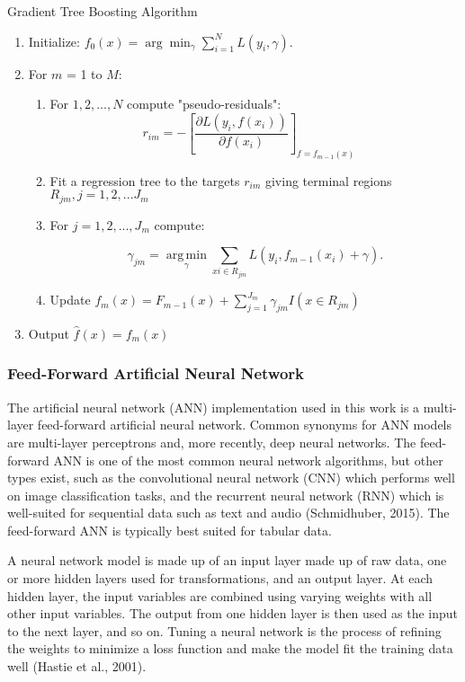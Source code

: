 \documentclass[12pt,]{article}
\begin{document}
\begin{algorithm}
  \caption{Gradient Tree Boosting Algorithm}\label{alg:GBMAlo}
\begin{enumerate}
\item Initialize: $f_0(x) = \arg\min_\gamma \sum_{i=1}^N L(y_i, \gamma).$
\item For $m$ = 1 to $M$:
  \begin{enumerate}
  \item For $1,2,...,N$ compute "pseudo-residuals":
  $$
   r_{im} = -\left[\frac{\partial L(y_i, f(x_i))}{\partial f(x_i)}\right]_{f=f_{m-1}(x)} \quad
  $$
  \item Fit a regression tree to the targets $r_{im}$ giving terminal regions $R_{jm}, j = 1,2,...J_m$
  \item For $j = 1,2,...,J_m$ compute:
  
  $$
  \gamma_{jm} = \underset{\gamma}{\operatorname{arg\,min}} \sum_{xi \in R_{jm}} L\left(y_i, f_{m-1}(x_i) + \gamma \right).
  $$
  \item Update $f_m(x) = F_{m-1}(x) + \sum_{j=1}^{J_m}\gamma_{jm}I(x \in R_{jm})$
  \end{enumerate}
\item Output $\hat{f}(x) = f_m(x)$
\end{enumerate}
\end{algorithm}

\hypertarget{feed-forward-artificial-neural-network}{%
\subsubsection{Feed-Forward Artificial Neural
Network}\label{feed-forward-artificial-neural-network}}

The artificial neural network (ANN) implementation used in this work is
a multi-layer feed-forward artificial neural network. Common synonyms
for ANN models are multi-layer perceptrons and, more recently, deep
neural networks. The feed-forward ANN is one of the most common neural
network algorithms, but other types exist, such as the convolutional
neural network (CNN) which performs well on image classification tasks,
and the recurrent neural network (RNN) which is well-suited for
sequential data such as text and audio (Schmidhuber, 2015). The
feed-forward ANN is typically best suited for tabular data.

A neural network model is made up of an input layer made up of raw data,
one or more hidden layers used for transformations, and an output layer.
At each hidden layer, the input variables are combined using varying
weights with all other input variables. The output from one hidden layer
is then used as the input to the next layer, and so on. Tuning a neural
network is the process of refining the weights to minimize a loss
function and make the model fit the training data well (Hastie et al.,
2001).
\end{document}
